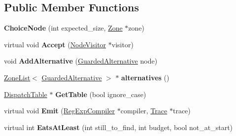 \subsection*{Public Member Functions}
\begin{DoxyCompactItemize}
\item 
\hypertarget{classv8_1_1internal_1_1_choice_node_a018fa28745789e0eb28b243570ed025c}{}{\bfseries Choice\+Node} (int expected\+\_\+size, \hyperlink{classv8_1_1internal_1_1_zone}{Zone} $\ast$zone)\label{classv8_1_1internal_1_1_choice_node_a018fa28745789e0eb28b243570ed025c}

\item 
\hypertarget{classv8_1_1internal_1_1_choice_node_a53d7cb491441f0469f69073aab9de65e}{}virtual void {\bfseries Accept} (\hyperlink{classv8_1_1internal_1_1_node_visitor}{Node\+Visitor} $\ast$visitor)\label{classv8_1_1internal_1_1_choice_node_a53d7cb491441f0469f69073aab9de65e}

\item 
\hypertarget{classv8_1_1internal_1_1_choice_node_a43dcb33c0c050a62d779d8d7c82ab868}{}void {\bfseries Add\+Alternative} (\hyperlink{classv8_1_1internal_1_1_guarded_alternative}{Guarded\+Alternative} node)\label{classv8_1_1internal_1_1_choice_node_a43dcb33c0c050a62d779d8d7c82ab868}

\item 
\hypertarget{classv8_1_1internal_1_1_choice_node_a2e4d4b33b955dfbef9722332f9209906}{}\hyperlink{classv8_1_1internal_1_1_zone_list}{Zone\+List}$<$ \hyperlink{classv8_1_1internal_1_1_guarded_alternative}{Guarded\+Alternative} $>$ $\ast$ {\bfseries alternatives} ()\label{classv8_1_1internal_1_1_choice_node_a2e4d4b33b955dfbef9722332f9209906}

\item 
\hypertarget{classv8_1_1internal_1_1_choice_node_a0e140854cd34988a22154bca49ead44c}{}\hyperlink{classv8_1_1internal_1_1_dispatch_table}{Dispatch\+Table} $\ast$ {\bfseries Get\+Table} (bool ignore\+\_\+case)\label{classv8_1_1internal_1_1_choice_node_a0e140854cd34988a22154bca49ead44c}

\item 
\hypertarget{classv8_1_1internal_1_1_choice_node_afdb66d254862379b9ee921a0bf85077d}{}virtual void {\bfseries Emit} (\hyperlink{classv8_1_1internal_1_1_reg_exp_compiler}{Reg\+Exp\+Compiler} $\ast$compiler, \hyperlink{classv8_1_1internal_1_1_trace}{Trace} $\ast$trace)\label{classv8_1_1internal_1_1_choice_node_afdb66d254862379b9ee921a0bf85077d}

\item 
\hypertarget{classv8_1_1internal_1_1_choice_node_ab757cf462efb1b94601ee36bae019536}{}virtual int {\bfseries Eats\+At\+Least} (int still\+\_\+to\+\_\+find, int budget, bool not\+\_\+at\+\_\+start)\label{classv8_1_1internal_1_1_choice_node_ab757cf462efb1b94601ee36bae019536}


\end{DoxyCompactItemize}
